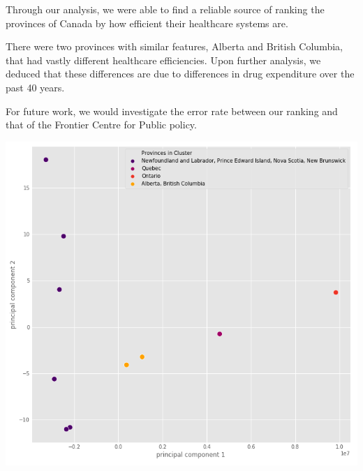 \documentclass[preprint,12pt]{elsarticle}
\begin{document}
Through our analysis, we were able to find a reliable source of ranking the provinces of Canada by how efficient their healthcare systems are. 

There were two provinces with similar features, Alberta and British Columbia, that had vastly different healthcare efficiencies. Upon further analysis, we deduced that these differences are due to differences in drug expenditure over the past 40 years. 

For future work, we would investigate the error rate between our ranking and that of the Frontier Centre for Public policy. 

\begin{center}
    \includegraphics[scale=0.4]{images/clusters.png}
\end{center}





\end{document}
